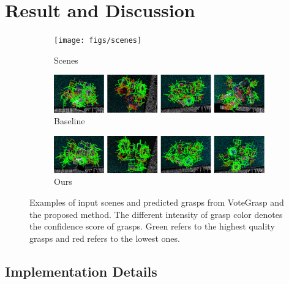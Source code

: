 \section{Result and Discussion}
\label{sec:evaluation}

\begin{figure}[h!]
  \centering
 
  
  \begin{subfigure}[b]{0.98\linewidth}
    \texttt{[image: figs/scenes]}
  \caption{Scenes}  
  \end{subfigure}
  \begin{subfigure}[b]{0.98\linewidth}
    \includegraphics[width=0.98\linewidth]{figs/vg_result}
  \caption{Baseline}  
  \end{subfigure}  
  \begin{subfigure}[b]{0.98\linewidth}
    \includegraphics[width=0.98\linewidth]{figs/nvg_result}
  \caption{Ours}  
  \end{subfigure}  
    
  \caption{Examples of input scenes and predicted grasps from VoteGrasp \cite{hoang2022context} and the proposed method. The different intensity of grasp color denotes the confidence score of grasps. Green refers to the highest quality grasps and red refers to the lowest ones.}
  \label{fig:grasp_result}
\end{figure}

\subsection{Implementation Details}
\label{sec:implement}


